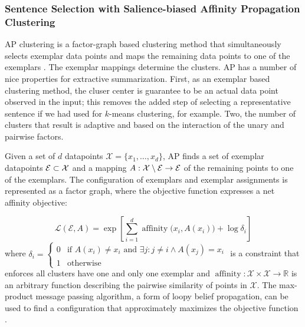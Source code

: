 \subsubsection{Sentence Selection with Salience-biased Affinity Propagation Clustering}


    AP clustering is a factor-graph based clustering
    method that simultaneously selects exemplar data points and maps 
    the remaining data points to one of the exemplars \cite{frey2007clustering}. 
    The exemplar mappings determine the clusters.
    AP has a number of nice properties for extractive summarization.
    First, as an exemplar based clustering method, the cluser center
    is guarantee to be an actual data point observed in the input; 
    this removes the added step of selecting a representative sentence
    if we had used for $k$-means clustering, for example.
    Two, the number of clusters that result is adaptive and 
    based on the interaction of the unary and pairwise factors.

    Given a set of $d$ datapoints $\mathcal{X} = \{x_1, \ldots, x_d\}$, 
    AP finds a set of
    exemplar datapoints $\mathcal{E} \subset \mathcal{X}$ and a mapping
    $A : \mathcal{X} \setminus \mathcal{E}\rightarrow\mathcal{E}$ of the 
    remaining points to one of the exemplars. The configuration of exemplars
    and exemplar assignments is represented as a factor graph, where the
    objective function expresses a net affinity objective:
    
    \[ \mathcal{L}(\mathcal{E}, A) 
        = \exp\left[
            \sum_{i=1}^d \operatorname{affinity}\Big(x_i, A(x_i)\Big) + 
          \log \delta_i \right] \]
    where $\delta_i = \begin{cases} 0 & \textrm{if $A(x_i) \neq x_i$ and $\exists j: j\neq i \wedge A(x_j)=x_i$} \\
1 & \textrm{otherwise}\end{cases}$ is a constraint that enforces all clusters
 have one and only one exemplar and $\operatorname{affinity}:\mathcal{X} 
 \times \mathcal{X} \rightarrow \mathbb{R} $
 is an arbitrary function describing the pairwise similarity of points in 
 $\mathcal{X}$.
 The max-product message passing algorithm,
 a form of loopy belief propagation, can be used to find a configuration
 that approximately maximizes the objective function \citep{dueck2009affinity}.

